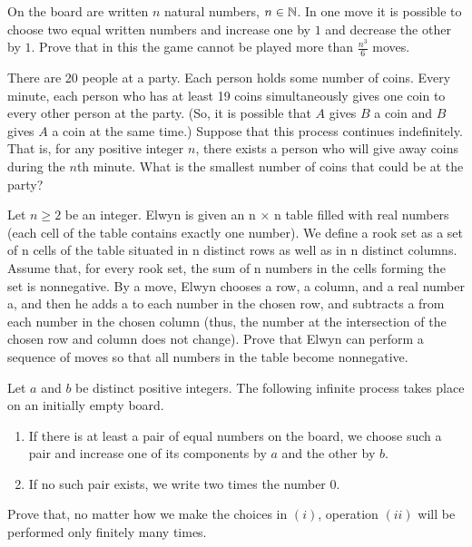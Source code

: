 \begin{problem} [Serbia 2022]
    On the board are written $n$ natural numbers, $n\in \mathbb N$. In one move it is possible to choose two equal written numbers and increase one by $1$ and decrease the other by $1$. Prove that in this the game cannot be played more than $\frac{n^3}{6}$ moves.
\end{problem}
\begin{problem} [ELMOSL 2013]
There are 20 people at a party. Each person holds some number of coins. Every minute, each person who has at least 19 coins simultaneously gives one coin to every other person at the party. (So, it is possible that $A$ gives $B$ a coin and $B$ gives $A$ a coin at the same time.) Suppose that this process continues indefinitely. That is, for any positive integer $n$, there exists a person who will give away coins during the $n$th minute. What is the smallest number of coins that could be at the party?
\end{problem}
\begin{problem} [IZHO 2021]
  Let $n \geq 2$ be an integer. Elwyn is given an n × n table filled with real numbers (each cell of the table contains exactly one number). We define a rook set as a set of n cells of the table situated in n distinct rows as well as in n distinct columns. Assume that, for every rook set, the sum of n numbers in the cells forming the set is nonnegative. By a move, Elwyn chooses a row, a column, and a real number a, and then he adds a to each number in the chosen row, and subtracts a from each number in the chosen column (thus, the number at the intersection of the chosen row and column does not change). Prove that Elwyn can perform a sequence of moves so that all numbers in the table become nonnegative.
\end{problem}
\begin{problem} [ISL 2018]
Let $a$ and $b$ be distinct positive integers. The following infinite process takes place on an initially empty board.
\begin{enumerate}
    \item If there is at least a pair of equal numbers on the board, we choose such a pair and increase one of its components by $a$ and the other by $b$.
    \item If no such pair exists, we write two times the number $0$.   
\end{enumerate}
Prove that, no matter how we make the choices in $(i)$, operation $(ii)$ will be performed only finitely many times.
\end{problem}




